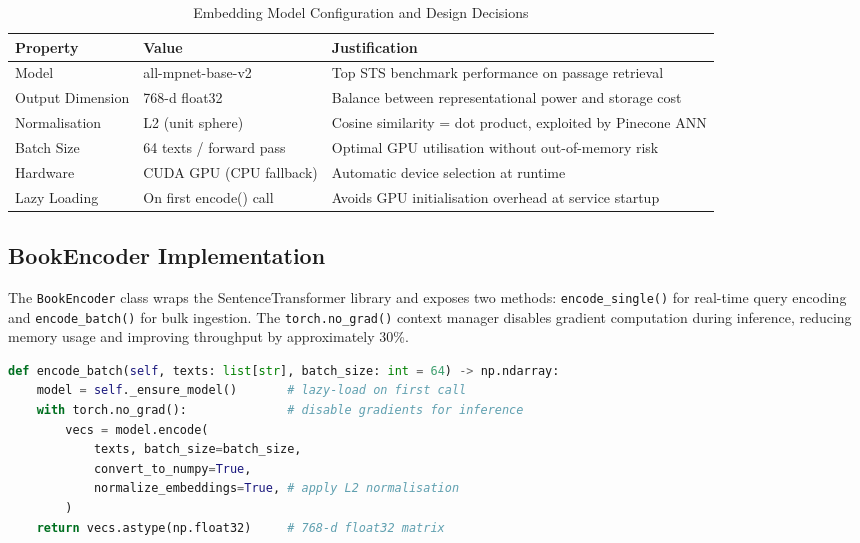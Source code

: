 \begin{table}[H]
\centering
\caption{Embedding Model Configuration and Design Decisions}
\label{tab:embedding}
\begin{tabularx}{\textwidth}{|l|l|X|}
\hline
\textbf{Property} & \textbf{Value} & \textbf{Justification} \\
\hline
Model            & all-mpnet-base-v2       & Top STS benchmark performance on passage retrieval \\
\hline
Output Dimension & 768-d float32           & Balance between representational power and storage cost \\
\hline
Normalisation    & L2 (unit sphere)        & Cosine similarity = dot product, exploited by Pinecone ANN \\
\hline
Batch Size       & 64 texts / forward pass & Optimal GPU utilisation without out-of-memory risk \\
\hline
Hardware         & CUDA GPU (CPU fallback) & Automatic device selection at runtime \\
\hline
Lazy Loading     & On first encode() call  & Avoids GPU initialisation overhead at service startup \\
\hline
\end{tabularx}
\end{table}

\subsection{BookEncoder Implementation}

The \texttt{BookEncoder} class wraps the SentenceTransformer library and
exposes two methods: \texttt{encode\_single()} for real-time query encoding
and \texttt{encode\_batch()} for bulk ingestion. The
\texttt{torch.no\_grad()} context manager disables gradient computation during
inference, reducing memory usage and improving throughput by approximately
30\%.

\begin{lstlisting}[language=Python, caption=BookEncoder encode\_batch method, 
  basicstyle=\ttfamily\footnotesize, breaklines=true]
def encode_batch(self, texts: list[str], batch_size: int = 64) -> np.ndarray:
    model = self._ensure_model()       # lazy-load on first call
    with torch.no_grad():              # disable gradients for inference
        vecs = model.encode(
            texts, batch_size=batch_size,
            convert_to_numpy=True,
            normalize_embeddings=True, # apply L2 normalisation
        )
    return vecs.astype(np.float32)     # 768-d float32 matrix
\end{lstlisting}

